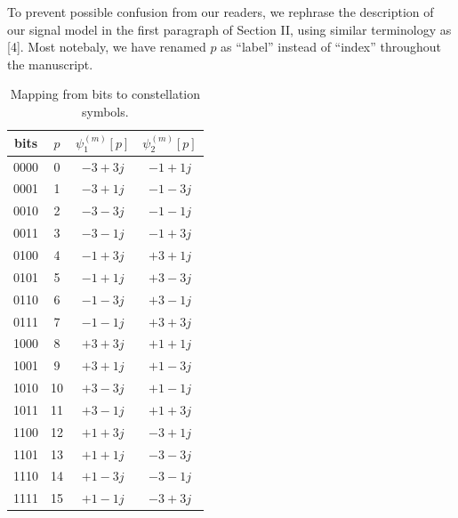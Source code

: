 \documentclass[onecolumn, 11pt, draftclsnofoot]{IEEEtran}
\begin{document}
To prevent possible confusion from our readers, we rephrase the description of
our signal model in the first paragraph of Section II, using similar
terminology as [4]. Most notebaly, we have renamed $p$ as ``label'' instead of
``index'' throughout the manuscript.

\begin{table}[!t]
  \renewcommand{\arraystretch}{1.3}
  \caption{Mapping from bits to constellation symbols.}
  \label{table:mapping}
  \centering
  \begin{tabular}{c|c|c|c}
    \hline
     bits & $p$ & $\psi_1^{(m)}[p]$ & $\psi_2^{(m)}[p]$  \\
    \hline
    0000 & 0 & $-3+3j$ & $-1+1j$ \\
    0001 & 1 & $-3+1j$ & $-1-3j$ \\
    0010 & 2 & $-3-3j$ & $-1-1j$ \\
    0011 & 3 & $-3-1j$ & $-1+3j$ \\
    0100 & 4 & $-1+3j$ & $+3+1j$ \\
    0101 & 5 & $-1+1j$ & $+3-3j$ \\
    0110 & 6 & $-1-3j$ & $+3-1j$ \\
    0111 & 7 & $-1-1j$ & $+3+3j$ \\
    1000 & 8 & $+3+3j$ & $+1+1j$ \\
    1001 & 9 & $+3+1j$ & $+1-3j$ \\
    1010 & 10 & $+3-3j$ & $+1-1j$ \\
    1011 & 11 & $+3-1j$ & $+1+3j$ \\
    1100 & 12 & $+1+3j$ & $-3+1j$ \\
    1101 & 13 & $+1+1j$ & $-3-3j$ \\
    1110 & 14 & $+1-3j$ & $-3-1j$ \\
    1111 & 15 & $+1-1j$ & $-3+3j$ \\
    \hline
  \end{tabular}
\end{table}
\end{document}
